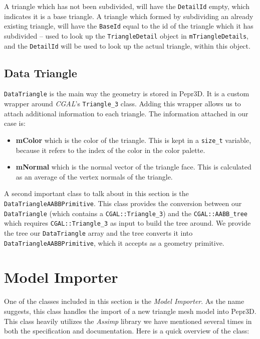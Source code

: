 A triangle which has not been subdivided, will have the \texttt{DetailId} empty, which indicates it is a base triangle. A triangle which formed by subdividing an already existing triangle, will have the \texttt{BaseId} equal to the id of the triangle which it has subdivided -- used to look up the \texttt{TriangleDetail} object in \texttt{mTriangleDetails}, and the \texttt{DetailId} will be used to look up the actual triangle, within this object.

\subsection{Data Triangle}

\texttt{DataTriangle} is the main way the geometry is stored in Pepr3D. It is a custom wrapper around \textit{CGAL}'s \texttt{Triangle\_3} class. Adding this wrapper allows us to attach additional information to each triangle. The information attached in our case is:

\begin{itemize}
\item \textbf{mColor} which is the color of the triangle. This is kept in a \texttt{size\_t} variable, because it refers to the index of the color in the color palette.

\item \textbf{mNormal} which is the normal vector of the triangle face. This is calculated as an average of the vertex normals of the triangle.

\end{itemize}

A second important class to talk about in this section is the \texttt{Data\-Triangle\-AABB\-Primitive}. This class provides the conversion between our \texttt{Data\-Tri\-angle} (which contains a \texttt{CGAL::Triangle\_3}) and the \texttt{CGAL::AABB\_tree} which requires \texttt{CGAL::Triangle\_3} as input to build the tree around. We provide the tree our \texttt{Data\-Triangle} array and the tree converts it into \texttt{Data\-Triangle\-AABB\-Primitive}, which it accepts as a geometry primitive.

\section{Model Importer}

One of the classes included in this section is the \textit{Model Importer}. As the name suggests, this class handles the import of a new triangle mesh model into Pepr3D. This class heavily utilizes the \textit{Assimp} library we have mentioned several times in both the specification and documentation. Here is a quick overview of the class:

